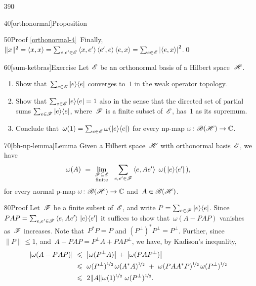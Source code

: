 \begin{parsec}{390}
\begin{point}{40}[orthonormal]{Proposition}
\begin{point}{50}{Proof}
\ref{orthonormal-4}\ 
Finally,
$\|x\|^2=\left<x,x\right>
= \sum_{e,e'\in\mathscr{E}}
\left<x,e'\right>\left<e',e\right>\left<e,x\right>
= \sum_{e\in \mathscr{E}} \left|\left<e,x\right>\right|^2$.\qed
\end{point}
\end{point}
\begin{point}{60}[sum-ketbras]{Exercise}%
Let~$\mathscr{E}$ be an orthonormal basis of a Hilbert space~$\mathscr{H}$.
\begin{enumerate}
\item
Show that~$\sum_{e\in\mathscr{E}} \left|e\right>\!\left<e\right|$
converges to~$1$
in the weak operator topology.
\item
Show that $\sum_{e\in\mathscr{E}}\left|e\right>\!\left<e\right|=1$
also in the sense
that the directed
set of partial sums
$\sum_{e\in \mathscr{F}} \left|e\right>\!\left<e\right|$,
where~$\mathscr{F}$ is a finite subset of~$\mathscr{E}$,
has~$1$ as its supremum.
\item
Conclude that~$\omega(1)=\sum_{e\in\mathscr{E}} \omega(\left|e\right>\!\left<e\right|)$
for every np-map $\omega\colon \mathscr{B}(\mathscr{H})\to\mathbb{C}$.
\end{enumerate}
\spacingfix%
\end{point}%
\begin{point}{70}[bh-np-lemma]{Lemma}%
Given a Hilbert space~$\mathscr{H}$
with orthonormal basis~$\mathscr{E}$,
we have
\begin{equation*}
	\omega(A)\ = \
	\lim_{\substack{\scrF\subseteq\scrE\\\text{finite}}}\ \
	\sum_{e,e'\in\scrF} \left<e,Ae'\right>\ \omega(\,\ketbra{e}{e'}\,),
\end{equation*}
for every normal p-map $\omega\colon \mathscr{B}(\mathscr{H})\to\mathbb{C}$
and~$A\in\mathscr{B}(\mathscr{H})$.
\begin{point}{80}{Proof}%
Let~$\mathscr{F}$ be a finite subset of~$\mathscr{E}$,
and write $P=\sum_{e\in \mathscr{F}} \left|e\right>\!\left<e\right|$.
Since $PAP
= \sum_{e,e'\in\mathscr{F}}\left<e,Ae'\right>\,\left|e\right>\!\left<e'\right|$
it suffices
to show that~$\omega(A-PAP)$
vanishes as~$\mathscr{F}$ increases.
Note that~$P^*P=P$ and
$(P^\perp)^*P^\perp=P^\perp$.
Further,
since
$\|P\|\leq 1$,
and~$A-PAP=P^\perp A + PAP^\perp$,
we have,
by Kadison's inequality,
\begin{alignat*}{3}
\left|\omega(A-PAP)\right|
\ &\leq\  \left|\omega(P^\perp A)\right| \,+\,\left|\omega(PAP^\perp)\right| \\
\ &\leq\  
\omega(P^\perp)^{\nicefrac{1}{2}}\,
\omega(A^*A)^{\nicefrac{1}{2}}
\ +\ 
\omega(PAA^*P)^{\nicefrac{1}{2}}\,
\omega(P^\perp)^{\nicefrac{1}{2}}\\
\ &\leq\  
2\|A\| 
\omega(1)^{\nicefrac{1}{2}}\ 
\omega(P^\perp)^{\nicefrac{1}{2}}.

\end{alignat*}
\end{point}
\end{point}
\end{parsec}
